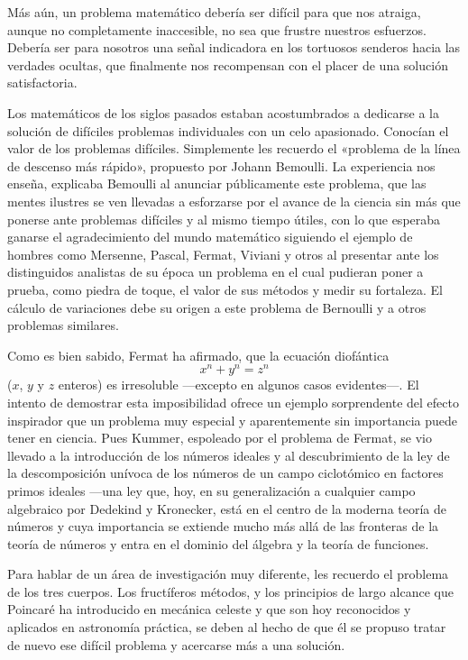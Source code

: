 \documentclass[a4paper, 12pt]{article}
\begin{document}
Más aún, un problema matemático debería ser difícil para que nos atraiga, aunque no completamente inaccesible, no sea que frustre nuestros esfuerzos. Debería ser para nosotros una señal indicadora en los tortuosos senderos hacia las verdades ocultas, que finalmente nos recompensan con el placer de una solución satisfactoria. 

Los matemáticos de los siglos pasados estaban acostumbrados a dedicarse a la solución de difíciles problemas individuales con un celo apasionado. Conocían el valor de los problemas difíciles. Simplemente les recuerdo el «problema de la línea de descenso más rápido», propuesto por Johann Bemoulli. La experiencia nos enseña, explicaba Bemoulli al anunciar públicamente este problema, que las mentes ilustres se ven llevadas a esforzarse por el avance de la ciencia sin más que ponerse ante problemas difíciles y al mismo tiempo útiles, con lo que esperaba ganarse el agradecimiento del mundo matemático siguiendo el ejemplo de hombres como Mersenne, Pascal, Fermat, Viviani y otros al presentar ante los distinguidos analistas de su época un problema en el cual pudieran poner a prueba, como piedra de toque, el valor de sus métodos y medir su fortaleza. El cálculo de variaciones debe su origen a este problema de Bernoulli y a otros problemas similares. 

Como es bien sabido, Fermat ha afirmado, que la ecuación diofántica 
$$
x^n+y^n=z^n
$$
($x$, $y$ y $z$ enteros) es irresoluble ---excepto en algunos casos evidentes---. El 
intento de demostrar esta imposibilidad ofrece un ejemplo sorprendente del efecto inspirador que un problema muy especial y aparentemente sin importancia puede tener en ciencia. Pues Kummer, espoleado por el problema de Fermat, se vio llevado a la introducción de los números ideales  y al descubrimiento de la ley de la descomposición unívoca de los números de un campo ciclotómico en factores primos ideales ---una ley que, hoy, en su generalización a cualquier campo algebraico por Dedekind y Kronecker, está en el centro de la moderna teoría de números y cuya importancia se extiende mucho más allá de las fronteras de la teoría de números y entra en el dominio del álgebra y la teoría de funciones. 

Para hablar de un área de investigación muy diferente, les recuerdo el problema de los tres cuerpos. Los fructíferos métodos, y los principios de largo alcance que Poincaré ha introducido en mecánica celeste y que son hoy reconocidos y aplicados en astronomía práctica, se deben al hecho de que él se propuso tratar de nuevo ese difícil problema y acercarse más a una solución.
\end{document}
